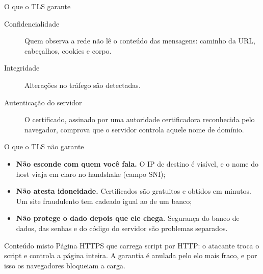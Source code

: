 \documentclass{beamer}
\begin{document}
\begin{frame}{O que o TLS garante}
  \begin{description}
    \item[Confidencialidade] Quem observa a rede não lê o conteúdo das
      mensagens: caminho da URL, cabeçalhos, cookies e corpo.
    \item[Integridade] Alterações no tráfego são detectadas.
    \item[Autenticação do servidor] O certificado, assinado por uma autoridade
      certificadora reconhecida pelo navegador, comprova que o servidor controla
      aquele nome de domínio.
  \end{description}
\end{frame}

\begin{frame}{O que o TLS não garante}
  \begin{itemize}
    \item \textbf{Não esconde com quem você fala.} O IP de destino é visível, e
          o nome do host viaja em claro no handshake (campo SNI);
    \item \textbf{Não atesta idoneidade.} Certificados são gratuitos e obtidos em
          minutos. Um site fraudulento tem cadeado igual ao de um banco;
    \item \textbf{Não protege o dado depois que ele chega.} Segurança do banco de
          dados, das senhas e do código do servidor são problemas separados.
  \end{itemize}

  \vspace{0.3cm}
  \begin{alertblock}{Conteúdo misto}
    Página HTTPS que carrega script por HTTP: o atacante troca o script e
    controla a página inteira. A garantia é anulada pelo elo mais fraco, e por
    isso os navegadores bloqueiam a carga.
  \end{alertblock}
\end{frame}
\end{document}
